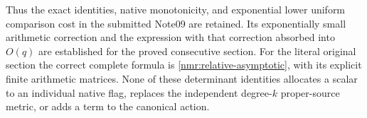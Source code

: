 Thus the exact identities, native monotonicity, and exponential lower
uniform comparison cost in the submitted Note09 are retained.
Its exponentially small arithmetic correction and the expression
with that correction absorbed into $O(q)$ are established for the
proved consecutive section. For the literal original section the
correct complete formula is \eqref{nmr:relative-asymptotic}, with
its explicit finite arithmetic matrices. None of these determinant identities allocates
a scalar to an individual native flag, replaces the independent
degree-$k$ proper-source metric, or adds a term to the canonical action.
